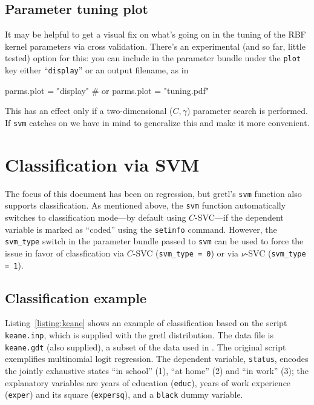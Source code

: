 \documentclass{article}
\begin{document}
\subsection{Parameter tuning plot}
\label{sec:plot}

It may be helpful to get a visual fix on what's going on in the tuning
of the RBF kernel parameters via cross validation. There's an
experimental (and so far, little tested) option for this: you can
include in the parameter bundle under the \texttt{plot} key either
``\texttt{display}'' or an output filename, as in
\begin{code}
parms.plot = "display"
# or
parms.plot = "tuning.pdf"
\end{code}
This has an effect only if a two-dimensional ($C, \gamma$) parameter
search is performed. If \texttt{svm} catches on we have in mind to
generalize this and make it more convenient.

\section{Classification via SVM}
\label{sec:SVC}

The focus of this document has been on regression, but gretl's
\texttt{svm} function also supports classification. As mentioned
above, the \texttt{svm} function automatically switches to
classification mode---by default using $C$-SVC---if the dependent
variable is marked as ``coded'' using the \texttt{setinfo} command.
However, the \texttt{svm\_type} switch in the parameter bundle passed
to \texttt{svm} can be used to force the issue in favor of
classfication via $C$-SVC (\texttt{svm\_type = 0}) or via $\nu$-SVC
(\texttt{svm\_type = 1}).

\subsection{Classification example}
\label{sec:SVC-example}

Listing~\ref{listing:keane} shows an example of classification based
on the script \texttt{keane.inp}, which is supplied with the gretl
distribution. The data file is \texttt{keane.gdt} (also supplied), a
subset of the data used in \cite{keane97}. The original script
exemplifies multinomial logit regression. The dependent variable,
\texttt{status}, encodes the jointly exhaustive states ``in school''
(1), ``at home'' (2) and ``in work'' (3); the explanatory variables
are years of education (\texttt{educ}), years of work experience
(\texttt{exper}) and its square (\texttt{expersq}), and a
\texttt{black} dummy variable.
\end{document}
